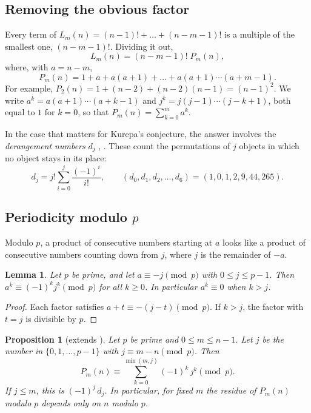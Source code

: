 \documentclass[11pt]{amsart}
\theoremstyle{plain}
\newtheorem{proposition}[theorem]{Proposition}
\newtheorem{lemma}[theorem]{Lemma}
\theoremstyle{definition}
\theoremstyle{remark}
\begin{document}
\subsection{Removing the obvious factor}
Every term of $L_m(n)=(n-1)!+\dots+(n-m-1)!$ is a multiple of the smallest
one, $(n-m-1)!$. Dividing it out,
\begin{equation}\label{eq:cofactor}
  L_m(n)=(n-m-1)!\;P_m(n),
\end{equation}
where, with $a=n-m$,
\[
  P_m(n)=1+a+a(a+1)+\dots+a(a+1)\cdots(a+m-1).
\]
For example, $P_2(n)=1+(n-2)+(n-2)(n-1)=(n-1)^2$. We write
$a^{\overline{k}}=a(a+1)\cdots(a+k-1)$ and
$j^{\underline{k}}=j(j-1)\cdots(j-k+1)$, both equal to $1$ for $k=0$, so that
$P_m(n)=\sum_{k=0}^{m}a^{\overline{k}}$.

In the case that matters for Kurepa's conjecture, the answer involves the
\emph{derangement numbers} $d_j$
\cite[\S2.2]{EC1}, \cite{A000166}. These count the permutations of $j$ objects
in which no object stays in its place:
\[
  d_j=j!\sum_{i=0}^{j}\frac{(-1)^i}{i!},\qquad (d_0,d_1,d_2,\dots,d_6)=(1,0,1,2,9,44,265).
\]

\subsection{\texorpdfstring{Periodicity modulo $p$}{Periodicity modulo p}}
Modulo $p$, a product of consecutive numbers starting at $a$ looks like a
product of consecutive numbers counting down from $j$, where $j$ is the
remainder of $-a$.

\begin{lemma}\label{lem:rising}
Let $p$ be prime, and let $a\equiv-j\pmod p$ with $0\le j\le p-1$. Then
$a^{\overline{k}}\equiv(-1)^k j^{\underline{k}}\pmod p$ for all $k\ge0$. In
particular $a^{\overline{k}}\equiv0$ when $k>j$.
\end{lemma}

\begin{proof}
Each factor satisfies $a+t\equiv-(j-t)\pmod p$. If $k>j$, the factor with
$t=j$ is divisible by $p$.
\end{proof}

\begin{proposition}[extends \cite{Kellner}]\label{thm:period}
Let $p$ be prime and $0\le m\le n-1$. Let $j$ be the number in
$\{0,1,\dots,p-1\}$ with $j\equiv m-n\pmod p$. Then
\[
  P_m(n)\equiv\sum_{k=0}^{\min(m,j)}(-1)^k\,j^{\underline{k}}\pmod p .
\]
If $j\le m$, this is $(-1)^j\,d_j$. In particular, for fixed $m$ the residue
of $P_m(n)$ modulo $p$ depends only on $n$ modulo $p$.
\end{proposition}
\end{document}
